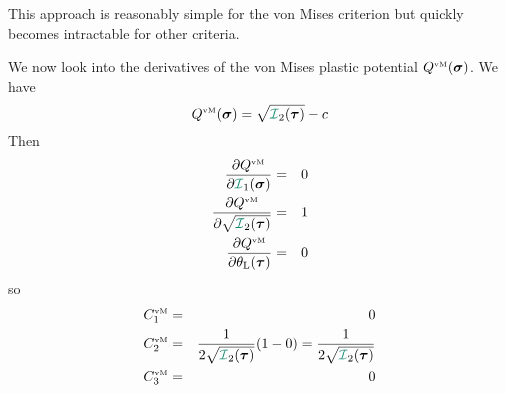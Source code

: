 This approach is reasonably simple for the von Mises criterion but 
quickly becomes intractable for other criteria.

\vspace{.5cm}

We now look into the derivatives of the von Mises plastic potential $Q^{\text{\tiny vM}}(\bm\sigma)$.
We have
\begin{equation}
Q^{\text{\tiny vM}}(\bm\sigma) =\sqrt{{\III}_2({\bm \tau})  } - c  
\end{equation}
Then
\begin{eqnarray}
\frac{\partial Q^{\text{\tiny vM}} }{\partial {\III}_1(\bm\sigma)} &=& 0 \\
\frac{\partial Q^{\text{\tiny vM}} }{\partial \sqrt{{\III}_2(\bm\tau)}}&=& 1 \\
\frac{\partial Q^{\text{\tiny vM}} }{\partial \theta_{\rm L}(\bm\tau)} &=& 0 
\end{eqnarray}
so 
\begin{eqnarray}
C_1^{\text{\tiny vM}} &=& 0  \\ 
C_2^{\text{\tiny vM}} 
&=& \frac{1}{2  \sqrt{{\III}_2(\bm\tau)}   } (1-0) 
= \frac{1}{2  \sqrt{{\III}_2(\bm\tau)}   } \\ 
C_3^{\text{\tiny vM}} &=& 0  
\end{eqnarray}



